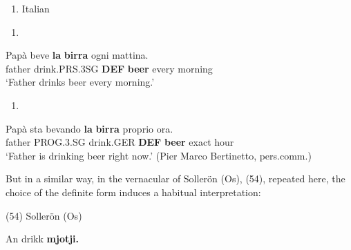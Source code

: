 \begin{enumerate} %
\item 
\label{bkm:Ref173317986}Italian

\end{enumerate} %
\setcounter{listLFOxcviiileveli}{0}
\begin{enumerate} %
\item 
\end{enumerate} %
\ea\label{}
\gll Papà  beve  \textbf{la} \textbf{birra} ogni  mattina.\\


father  drink.PRS.3SG  \textbf{DEF} \textbf{beer} every  morning\\ %


‘Father drinks beer every morning.’ 
\z


\begin{enumerate} %
\item 
\end{enumerate} %
\ea\label{}
\gll Papà  sta  bevando  \textbf{la} \textbf{birra} proprio  ora.\\


father  PROG.3.SG  drink.GER  \textbf{DEF} \textbf{beer} exact  hour\\ %


‘Father is drinking beer right now.’ (Pier Marco Bertinetto, pers.comm.)
\z

But in a similar way, in the vernacular of Sollerön (Os), (54), repeated here, the choice of the definite form induces a habitual interpretation:

(54)  Sollerön (Os) 

\ea\label{}
\gll An  drikk  \textbf{mjotji.}\\


